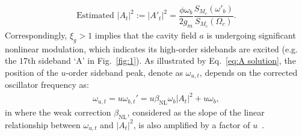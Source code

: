 \documentclass[aps,prl,twocolumn,superscriptaddress]{revtex4-2}
\begin{document}
\begin{equation}
\begin{split}
\text{Estimated} \,\,\vert A_t\vert^2:=\vert A'_t\vert^2=\dfrac{\phi\omega_b}{2g_m}\dfrac{S_{M_c}(\omega'_b)}{S_{M_c}(\Omega_c)}.
\end{split}
\label{eq:A calibrate}
\end{equation}
Correspondingly, $\xi_g>1$ implies that the cavity field $a$ is undergoing significant nonlinear modulation, which indicates its high-order sidebands are excited (e.g. the $17$th sideband `A' in Fig.~\ref{fig:1}). As  illustrated by Eq.~\eqref{eq:A solution}, the position of the $u$-order sideband peak, denote as $\omega_{u,t}$, depends on the corrected oscillator frequency as:
\begin{equation}
\begin{split}
\omega_{u,t}=u\omega_{b,t}'=u\beta_{\text{NL}}\omega_b\vert A_t\vert^2+u\omega_b,
\end{split}
\label{eq:fit}
\end{equation}
 in where the weak correction $\beta_{\text{NL}}$, considered as the slope of the linear relationship between $\omega_{u,t}$ and $\vert A_t\vert^2$, is also amplified by a factor of $u$~\cite{exp1}.
 
\end{document}
